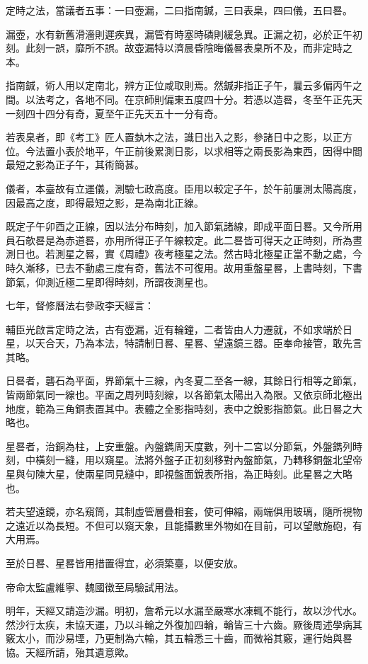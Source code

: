 \begin{pinyinscope}
定時之法，當議者五事：一曰壺漏，二曰指南鍼，三曰表臬，四曰儀，五曰晷。

漏壺，水有新舊滑濇則遲疾異，漏管有時塞時磷則緩急異。正漏之初，必於正午初刻。此刻一誤，靡所不誤。故壺漏特以濟晨昏陰晦儀晷表臬所不及，而非定時之本。

指南鍼，術人用以定南北，辨方正位咸取則焉。然鍼非指正子午，曩云多偏丙午之間。以法考之，各地不同。在京師則偏東五度四十分。若憑以造晷，冬至午正先天一刻四十四分有奇，夏至午正先天五十一分有奇。

若表臬者，即《考工》匠人置埶木之法，識日出入之影，參諸日中之影，以正方位。今法置小表於地平，午正前後累測日影，以求相等之兩長影為東西，因得中間最短之影為正子午，其術簡甚。

儀者，本臺故有立運儀，測驗七政高度。臣用以較定子午，於午前屢測太陽高度，因最高之度，即得最短之影，是為南北正線。

既定子午卯酉之正線，因以法分布時刻，加入節氣諸線，即成平面日晷。又今所用員石欹晷是為赤道晷，亦用所得正子午線較定。此二晷皆可得天之正時刻，所為晝測日也。若測星之晷，實《周禮》夜考極星之法。然古時北極星正當不動之處，今時久漸移，已去不動處三度有奇，舊法不可復用。故用重盤星晷，上書時刻，下書節氣，仰測近極二星即得時刻，所謂夜測星也。

七年，督修曆法右參政李天經言：

輔臣光啟言定時之法，古有壺漏，近有輪鐘，二者皆由人力遷就，不如求端於日星，以天合天，乃為本法，特請制日晷、星晷、望遠鏡三器。臣奉命接管，敢先言其略。

日晷者，礱石為平面，界節氣十三線，內冬夏二至各一線，其餘日行相等之節氣，皆兩節氣同一線也。平面之周列時刻線，以各節氣太陽出入為限。又依京師北極出地度，範為三角銅表置其中。表體之全影指時刻，表中之銳影指節氣。此日晷之大略也。

星晷者，治銅為柱，上安重盤。內盤鐫周天度數，列十二宮以分節氣，外盤鐫列時刻，中橫刻一縫，用以窺星。法將外盤子正初刻移對內盤節氣，乃轉移銅盤北望帝星與句陳大星，使兩星同見縫中，即視盤面銳表所指，為正時刻。此星晷之大略也。

若夫望遠鏡，亦名窺筒，其制虛管層疊相套，使可伸縮，兩端俱用玻璃，隨所視物之遠近以為長短。不但可以窺天象，且能攝數里外物如在目前，可以望敵施砲，有大用焉。

至於日晷、星晷皆用措置得宜，必須築臺，以便安放。

帝命太監盧維寧、魏國徵至局驗試用法。

明年，天經又請造沙漏。明初，詹希元以水漏至嚴寒水凍輒不能行，故以沙代水。然沙行太疾，未協天運，乃以斗輪之外復加四輪，輪皆三十六齒。厥後周述學病其竅太小，而沙易堙，乃更制為六輪，其五輪悉三十齒，而微裕其竅，運行始與晷協。天經所請，殆其遺意歟。


\end{pinyinscope}
